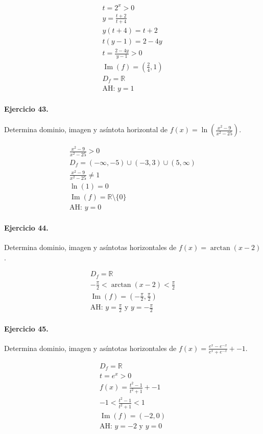 \documentclass[11pt,a4paper]{article}
\begin{document}
\[
\begin{aligned}
t=2^x>0\\
y=\frac{t+2}{t+4}\\
y(t+4)=t+2\\
t(y-1)=2-4y\\
t=\frac{2-4y}{y-1}>0\\
\operatorname{Im}(f)=(\frac{2}{4},1)\\
D_f=\mathbb{R}\\
\text{{AH: }}y=1
\end{aligned}
\]


\paragraph{Ejercicio 43.} Determina dominio, imagen y asíntota horizontal de $f(x)=\ln\left(\frac{x^2-9}{x^2-25}\right)$.

\[
\begin{aligned}
\frac{x^2-9}{x^2-25} >0\\
D_f=(-\infty,-5)\cup(-3,3)\cup(5,\infty)\\
\frac{x^2-9}{x^2-25}\ne1\\
\ln(1)=0\\
\operatorname{Im}(f)=\mathbb{R}\setminus\{0\}\\
\text{{AH: }}y=0
\end{aligned}
\]


\paragraph{Ejercicio 44.} Determina dominio, imagen y asíntotas horizontales de $f(x)=\arctan(x-2)$.

\[
\begin{aligned}
D_f=\mathbb{R}\\
-\frac{\pi}{2}<\arctan(x-2)<\frac{\pi}{2}\\
\operatorname{Im}(f)=\left(-\frac{\pi}{2},\frac{\pi}{2}\right)\\
\text{AH: }y=\frac{\pi}{2}\text{ y }y=-\frac{\pi}{2}
\end{aligned}
\]


\paragraph{Ejercicio 45.} Determina dominio, imagen y asíntotas horizontales de $f(x)=\frac{e^x-e^{-x}}{e^x+e^{-x}}+-1$.

\[
\begin{aligned}
D_f=\mathbb{R}\\
t=e^x>0\\
f(x)=\frac{t^2-1}{t^2+1}+-1\\
-1<\frac{t^2-1}{t^2+1}<1\\
\operatorname{Im}(f)=(-2,0)\\
\text{AH: }y=-2\text{ y }y=0
\end{aligned}
\]
\end{document}
